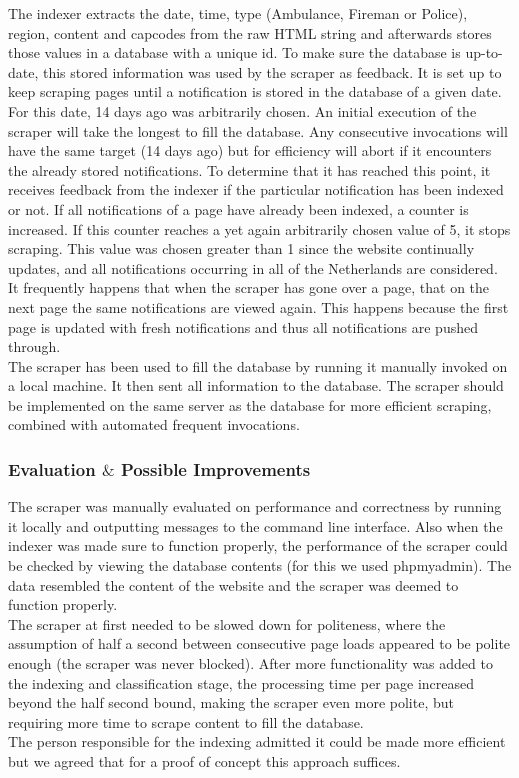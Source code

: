 The indexer extracts the date, time, type (Ambulance, Fireman or Police), region, content and capcodes from the raw HTML string and afterwards stores those values in a database with a unique id. To make sure the database is up-to-date, this stored information was used by the scraper as feedback. It is set up to keep scraping pages until a notification is stored in the database of a given date. For this date, 14 days ago was arbitrarily chosen. An initial execution of the scraper will take the longest to fill the database. Any consecutive invocations will have the same target (14 days ago) but for efficiency will abort if it encounters the already stored notifications. To determine that it has reached this point, it receives feedback from the indexer if the particular notification has been indexed or not. If all notifications of a page have already been indexed, a counter is increased. If this counter reaches a yet again arbitrarily chosen value of 5, it stops scraping. This value was chosen greater than 1 since the website continually updates, and all notifications occurring in all of the Netherlands are considered. It frequently happens that when the scraper has gone over a page, that on the next page the same notifications are viewed again. This happens because the first page is updated with fresh notifications and thus all notifications are pushed through.\\

The scraper has been used to fill the database by running it manually invoked on a local machine. It then sent all information to the database. The scraper should be implemented on the same server as the database for more efficient scraping, combined with automated frequent invocations.

\subsubsection*{Evaluation $\&$ Possible Improvements}
The scraper was manually evaluated on performance and correctness by running it locally and outputting messages to the command line interface. Also when the indexer was made sure to function properly, the performance of the scraper could be checked by viewing the database contents (for this we used phpmyadmin). The data resembled the content of the website and the scraper was deemed to function properly.\\

The scraper at first needed to be slowed down for politeness, where the assumption of half a second between consecutive page loads appeared to be polite enough (the scraper was never blocked). After more functionality was added to the indexing and classification stage, the processing time per page increased beyond the half second bound, making the scraper even more polite, but requiring more time to scrape content to fill the database. \\
The person responsible for the indexing admitted it could be made more efficient but we agreed that for a proof of concept this approach suffices.\\

